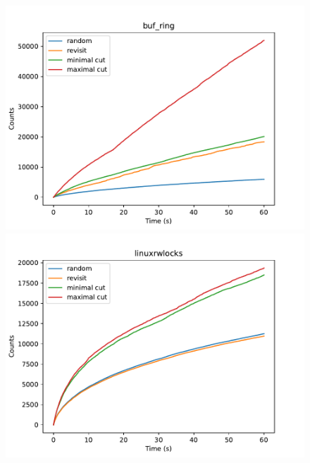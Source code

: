 \begin{figure}[h!]

	\centering
	\begin{minipage}{0.45\textwidth}
		\centering
		\includegraphics[width=\textwidth]{figure/genmc-time/buf_ring.pdf}
	\end{minipage}
	\hfill
	\begin{minipage}{0.45\textwidth}
		\centering
		\includegraphics[width=\textwidth]{figure/genmc-time/linuxrwlocks.pdf}
	\end{minipage}

	\vspace{0.5cm}


\end{figure}
